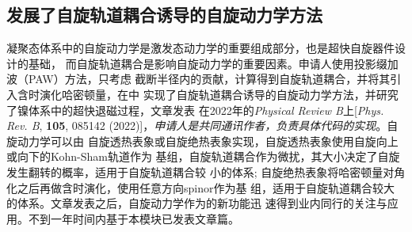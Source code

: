       





\subsection{发展了自旋轨道耦合诱导的自旋动力学方法}

凝聚态体系中的自旋动力学是激发态动力学的重要组成部分，也是超快自旋器件设计的基础，
而自旋轨道耦合是影响自旋动力学的重要因素。申请人使用投影缀加波（PAW）方法，只考虑
截断半径内的贡献，计算得到自旋轨道耦合，并将其引入含时演化哈密顿量，在\hnamd{}中
实现了自旋轨道耦合诱导的自旋动力学方法，并研究了镍体系中的超快退磁过程，文章发表
在2022年的\textit{Physical Review B}上[\textit{Phys. Rev. B}, \textbf{105},
085142 (2022)]，\emph{申请人是共同通讯作者，负责具体代码的实现}。自旋动力学可以由
自旋透热表象或自旋绝热表象实现，自旋透热表象使用自旋向上或向下的Kohn-Sham轨道作为
基组，自旋轨道耦合作为微扰，其大小决定了自旋发生翻转的概率，适用于自旋轨道耦合较
小的体系; 自旋绝热表象将哈密顿量对角化之后再做含时演化，使用任意方向spinor作为基
组，适用于自旋轨道耦合较大的体系。文章发表之后，自旋动力学作为\hnamd{}的新功能迅
速得到业内同行的关注与应用。不到一年时间内基于本模块已发表文章篇。

